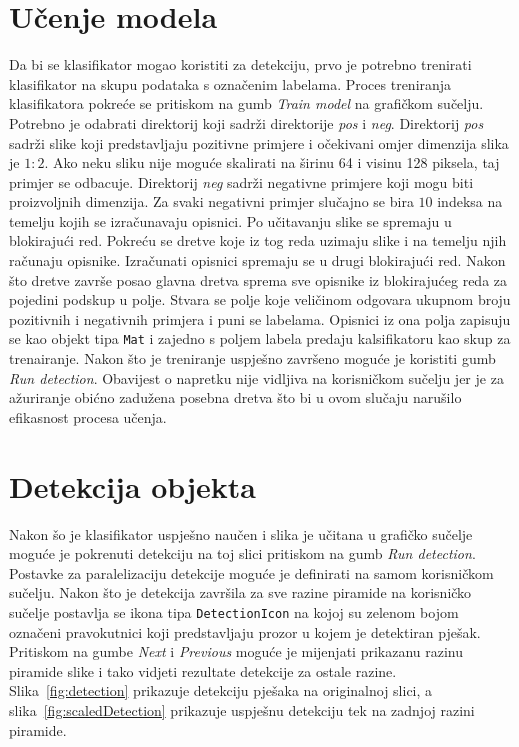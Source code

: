 \documentclass[times, utf8, zavrsni]{fer}
\begin{document}
\section{Učenje modela}
Da bi se klasifikator mogao koristiti za detekciju, prvo je potrebno trenirati klasifikator na skupu podataka s označenim labelama. Proces treniranja klasifikatora pokreće se pritiskom na gumb \textit{Train model} na grafičkom sučelju. Potrebno je odabrati direktorij koji sadrži direktorije \textit{pos} i \textit{neg}. Direktorij \textit{pos} sadrži slike koji predstavljaju pozitivne primjere i očekivani omjer dimenzija slika je \(1 : 2\). Ako neku sliku nije moguće skalirati na širinu 64 i visinu 128 piksela, taj primjer se odbacuje. Direktorij \textit{neg} sadrži negativne primjere koji mogu biti proizvoljnih dimenzija. Za svaki negativni primjer slučajno se bira \(10\) indeksa na temelju kojih se izračunavaju opisnici. Po učitavanju slike se spremaju u blokirajući red. Pokreću se dretve koje iz tog reda uzimaju slike i na temelju njih računaju opisnike. Izračunati opisnici spremaju se u drugi blokirajući red. Nakon što dretve završe posao glavna dretva sprema sve opisnike iz blokirajućeg reda za pojedini podskup u polje. Stvara se polje koje veličinom odgovara ukupnom broju pozitivnih i negativnih primjera i puni se labelama. Opisnici iz ona polja zapisuju se kao objekt tipa \verb|Mat| i zajedno s poljem labela predaju kalsifikatoru kao skup za trenairanje. Nakon što je treniranje uspješno završeno moguće je koristiti gumb \textit{Run detection}.  Obavijest o napretku nije vidljiva na korisničkom sučelju jer je za ažuriranje obićno zadužena posebna dretva što bi u ovom slučaju narušilo efikasnost procesa učenja.

\section{Detekcija objekta}
Nakon šo je klasifikator uspješno naučen i slika je učitana u grafičko sučelje moguće je pokrenuti detekciju na toj slici pritiskom na gumb \textit{Run detection}. Postavke za paralelizaciju detekcije moguće je definirati na samom korisničkom sučelju. Nakon što je detekcija završila za sve razine piramide na korisničko sučelje postavlja se ikona tipa \verb|DetectionIcon| na kojoj su zelenom bojom označeni pravokutnici koji predstavljaju prozor u kojem je detektiran pješak. Pritiskom na gumbe \textit{Next} i \textit{Previous} moguće je mijenjati prikazanu razinu piramide slike i tako vidjeti rezultate detekcije za  ostale razine. Slika~\ref{fig:detection} prikazuje detekciju pješaka na originalnoj slici, a slika~\ref{fig:scaledDetection} prikazuje uspješnu detekciju tek na zadnjoj razini piramide.
\end{document}
